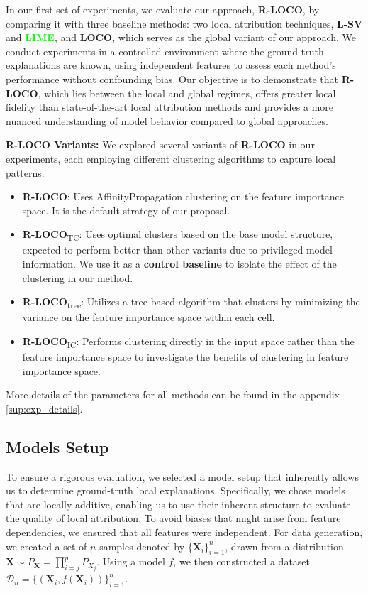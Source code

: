 \documentclass{article}
\newcommand\X{\boldsymbol{X}}
\theoremstyle{plain}
\theoremstyle{definition}
\theoremstyle{remark}
\newcommand{\ours}{\textcolor{ours}{\textbf{R-LOCO}}}
\newcommand{\loco}{\textcolor{loco}{\textbf{LOCO}}}
\newcommand{\ourstree}{\textcolor{ours}{\textbf{R-LOCO}}\textsubscript{tree}}
\newcommand{\ourstrue}{\textcolor{ours}{\textbf{R-LOCO}}\textsubscript{TC}}
\newcommand{\oursinput}{\textcolor{ours}{\textbf{R-LOCO}}\textsubscript{IC}}
\newcommand{\lsv}{\textcolor{lsv}{\textbf{L-SV}}}
\newcommand{\lime}{\textcolor{lime}{\textbf{LIME}}}
\begin{document}
In our first set of experiments, we evaluate our approach, \ours{}, by comparing it with three baseline methods: two local attribution techniques, \lsv{} and \lime{}, and \loco{}, which serves as the global variant of our approach. We conduct experiments in a controlled environment where the ground-truth explanations are known, using independent features to assess each method’s performance without confounding bias. Our objective is to demonstrate that \ours{}, which lies between the local and global regimes, offers greater local fidelity than state-of-the-art local attribution methods and provides a more nuanced understanding of model behavior compared to global approaches.

\textbf{\ours{} Variants:} We explored several variants of \ours{} in our experiments, each employing different clustering algorithms to capture local patterns. 
\begin{itemize}
    \item \ours{}: Uses AffinityPropagation clustering on the feature importance space. It is the default strategy of our proposal.
    \item \ourstrue{}: Uses optimal clusters based on the base model structure, expected to perform better than other variants due to privileged model information. We use it as a \textbf{control baseline} to isolate the effect of the clustering in our method.
      \item \ourstree{}: Utilizes a tree-based algorithm that clusters by minimizing the variance on the feature importance space within each cell.
    \item \oursinput{}: Performs clustering directly in the input space rather than the feature importance space to investigate the benefits of clustering in feature importance space.
\end{itemize}

More details of the parameters for all methods can be found in the appendix \ref{sup:exp_details}.
\subsection{Models Setup}

To ensure a rigorous evaluation, we selected a model setup that inherently allows us to determine ground-truth local explanations. Specifically, we chose models that are locally additive, enabling us to use their inherent structure to evaluate the quality of local attribution. To avoid biases that might arise from feature dependencies, we ensured that all features were independent. For data generation, we created a set of $n$ samples denoted by $\{\X_i\}_{i=1}^n$, drawn from a distribution $\X \sim P_{\X} = \prod_{i=j}^p P_{X_j}$. Using a model $f$, we then constructed a dataset $\mathcal{D}_n = \{(\X_i, f(\X_i))\}_{i=1}^n$.
\end{document}
